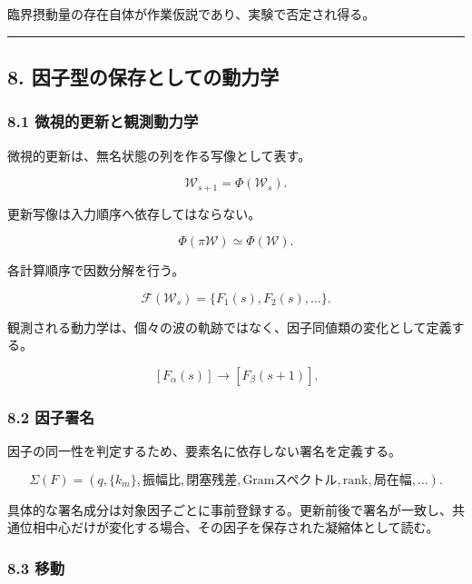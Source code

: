 \documentclass[
  a4paper,
]{ltjsarticle}
\begin{document}
臨界摂動量の存在自体が作業仮説であり、実験で否定され得る。

\begin{center}\rule{0.5\linewidth}{0.5pt}\end{center}

\subsection{8.
因子型の保存としての動力学}\label{ux56e0ux5b50ux578bux306eux4fddux5b58ux3068ux3057ux3066ux306eux52d5ux529bux5b66}

\subsubsection{8.1
微視的更新と観測動力学}\label{ux5faeux8996ux7684ux66f4ux65b0ux3068ux89b3ux6e2cux52d5ux529bux5b66}

微視的更新は、無名状態の列を作る写像として表す。

\[
\mathcal W_{s+1}
=
\Phi(\mathcal W_s).
\]

更新写像は入力順序へ依存してはならない。

\[
\Phi(\pi\mathcal W)
\simeq
\Phi(\mathcal W).
\]

各計算順序で因数分解を行う。

\[
\mathcal F(\mathcal W_s)
=
\{F_1(s),F_2(s),\ldots\}.
\]

観測される動力学は、個々の波の軌跡ではなく、因子同値類の変化として定義する。

\[
[F_\alpha(s)]
\longrightarrow
[F_\beta(s+1)].
\]

\subsubsection{8.2 因子署名}\label{ux56e0ux5b50ux7f72ux540d}

因子の同一性を判定するため、要素名に依存しない署名を定義する。

\[
\Sigma(F)
=
\left(
q,
\{k_m\},
\text{振幅比},
\text{閉塞残差},
\text{Gramスペクトル},
\text{rank},
\text{局在幅},
\ldots
\right).
\]

具体的な署名成分は対象因子ごとに事前登録する。更新前後で署名が一致し、共通位相中心だけが変化する場合、その因子を保存された凝縮体として読む。

\subsubsection{8.3 移動}\label{ux79fbux52d5}
\end{document}
